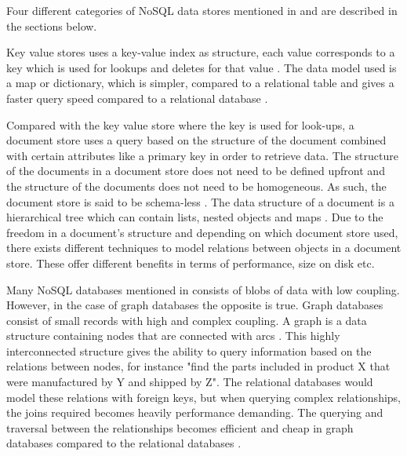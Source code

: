 
Four different categories of NoSQL data stores mentioned in \cite{Catell} and \cite{NoSQLDistilled} are described in the sections below.


Key value stores uses a key-value index as structure, each value corresponds to a key which is used for lookups and deletes for that value \cite{Catell}. The data model used is a map or dictionary, which is simpler, compared to a relational table and gives a faster query speed compared to a relational database \cite{NoSQLSurvey}.

Compared with the key value store where the key is used for look-ups, a document store uses a query based on the structure of the document combined with certain attributes like a primary key in order to retrieve data. The structure of the documents in a document store does not need to be defined upfront and the structure of the documents does not need to be homogeneous. As such, the document store is said to be schema-less \cite{NoSQLDistilled}. The data structure of a document is a hierarchical tree which can contain lists, nested objects and maps \cite{Catell, NoSQLDistilled}. Due to the freedom in a document's structure and depending on which document store used, there exists different techniques to model relations between objects in a document store. These offer different benefits in terms of performance, size on disk etc. 

Many NoSQL databases mentioned in \cite{Catell} consists of blobs of data with low coupling. However, in the case of graph databases the opposite is true. Graph databases consist of small records with high and complex coupling. A graph is a data structure containing nodes that are connected with arcs \cite{NoSQLDistilled}. This highly interconnected structure gives the ability to query information based on the relations between nodes, for instance "find the parts included in product X that were manufactured by Y and shipped by Z". The relational databases would model these relations with foreign keys, but when querying complex relationships, the joins required becomes heavily performance demanding. The querying and traversal between the relationships becomes efficient and cheap in graph databases compared to the relational databases \cite{NoSQLDistilled}.

